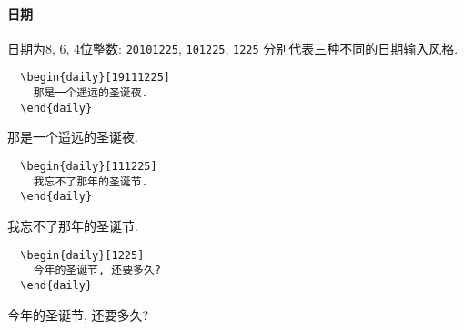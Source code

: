 \documentclass{SYSUDaily}
\begin{document}
\paragraph{日期}
日期为8, 6, 4位整数: \verb|20101225|, \verb|101225|, \verb|1225| 分别代表三种不同的日期输入风格.

\begin{multicols}{2}
	\begin{lstlisting}
  \begin{daily}[19111225]
    那是一个遥远的圣诞夜.
  \end{daily}
  \end{lstlisting}
	\small
	\begin{daily}[19111225]
		那是一个遥远的圣诞夜.
	\end{daily}
\end{multicols}


\begin{multicols}{2}
	\begin{lstlisting}
  \begin{daily}[111225]
    我忘不了那年的圣诞节.
  \end{daily}
  \end{lstlisting}
	\small
	\begin{daily}[111225]
		我忘不了那年的圣诞节.
	\end{daily}
\end{multicols}


\begin{multicols}{2}
	\begin{lstlisting}
  \begin{daily}[1225]
    今年的圣诞节, 还要多久?
  \end{daily}
  \end{lstlisting}
	\small
	\begin{daily}[1225]
		今年的圣诞节, 还要多久?
	\end{daily}
\end{multicols}
\end{document}
